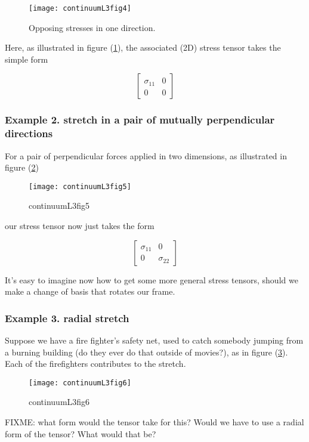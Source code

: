 \begin{figure}[htp]
   \centering
   \texttt{[image: continuumL3fig4]}
   \caption{Opposing stresses in one direction.}\label{fig:continuumL3:continuumL3fig4}
\end{figure}

Here, as illustrated in figure (\ref{fig:continuumL3:continuumL3fig4}), the associated (2D) stress tensor takes the simple form

\begin{equation}\label{eqn:continuumL3:370}
\begin{bmatrix}
\sigma_{11} & 0 \\
0 & 0
\end{bmatrix}
\end{equation}

\subsubsection{Example 2.  stretch in a pair of mutually perpendicular directions}

For a pair of perpendicular forces applied in two dimensions, as illustrated in figure (\ref{fig:continuumL3:continuumL3fig5})
\begin{figure}[htp]
   \centering
   \texttt{[image: continuumL3fig5]}
   \caption{continuumL3fig5}\label{fig:continuumL3:continuumL3fig5}
\end{figure}

our stress tensor now just takes the form

\begin{equation}\label{eqn:continuumL3:390}
\begin{bmatrix}
\sigma_{11} & 0 \\
0 & \sigma_{22}
\end{bmatrix}
\end{equation}

It's easy to imagine now how to get some more general stress tensors, should we make a change of basis that rotates our frame.

\subsubsection{Example 3.  radial stretch}

Suppose we have a fire fighter's safety net, used to catch somebody jumping from a burning building (do they ever do that outside of movies?), as in figure (\ref{fig:continuumL3:continuumL3fig6}).  Each of the firefighters contributes to the stretch.  

\begin{figure}[htp]
   \centering
   \texttt{[image: continuumL3fig6]}
   \caption{continuumL3fig6}\label{fig:continuumL3:continuumL3fig6}
\end{figure}

FIXME: what form would the tensor take for this?  Would we have to use a radial form of the tensor?  What would that be?

\EndArticle
